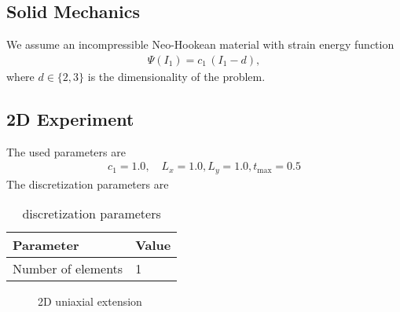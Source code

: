 %
\clearpage
%
%
%

\begin{frame}
\section{Solid Mechanics}
%
We assume an incompressible Neo-Hookean material with strain energy function
%
\begin{equation}\label{eq:material}
  \begin{array}{lll}
    \Psi(I_1) = c_1\,(I_1 - d),
  \end{array}
\end{equation}
%
where $d \in \{2,3\}$ is the dimensionality of the problem.

\end{frame}


\begin{frame}
\subsection{2D Experiment}
%
The used parameters are
\begin{equation*}
  \begin{array}{lll}
    c_1 = 1.0, \quad L_x = 1.0, L_y = 1.0, t_\text{max} = 0.5
  \end{array}
\end{equation*}
The discretization parameters are
\begin{table}[h!]
  \begin{center}
    \begin{tabular}{l|l}
      \textbf{Parameter} & \textbf{Value}\\
      \hline
      Number of elements & 1\\
    \end{tabular}
  \end{center}
  \caption{discretization parameters}
  \label{tab:table_solid_2d}
\end{table}

\begin{figure}%
  \centering%
  \def\svgwidth{0.8\textwidth}%
  \caption{2D uniaxial extension}%
  \label{fig:uniaxial_extension_2d}%
\end{figure}%

\end{frame}


